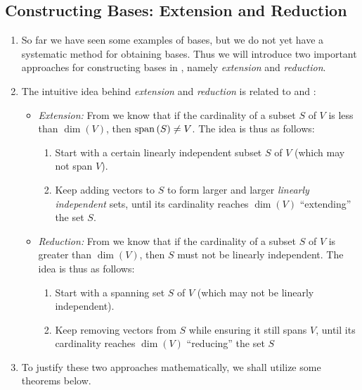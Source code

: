 \subsection{Constructing Bases: Extension and Reduction}
\label{subsect:construct-bases}
\begin{enumerate}
\item So far we have seen some examples of bases, but we do not yet have a
systematic method for obtaining bases. Thus we will introduce two important
approaches for constructing bases in , namely
\emph{extension} and \emph{reduction}.

\item The intuitive idea behind \emph{extension} and \emph{reduction} is
related to  and
:
\begin{itemize}
\item \emph{Extension:} From  we
know that if the cardinality of a subset \(S\) of \(V\) is less than
\(\dim(V)\), then \(\operatorname{span}\qty(S)\ne V\). The idea is thus as follows:
\begin{enumerate}
\item Start with a certain linearly independent subset \(S\) of \(V\) (which
may not span \(V\)).
\item  Keep adding vectors to \(S\) to form larger and larger \emph{linearly
independent} sets, until its cardinality reaches \(\dim(V)\)
 ``extending'' the set \(S\).
\end{enumerate}
\item \emph{Reduction:} From  we
know that if the cardinality of a subset \(S\) of \(V\) is greater than
\(\dim(V)\), then \(S\) must not be linearly independent. The idea is thus as follows:
\begin{enumerate}
\item Start with a spanning set \(S\) of \(V\) (which may not be linearly
independent).
\item Keep removing vectors from \(S\) while ensuring it still spans \(V\),
until its cardinality reaches \(\dim(V)\)  ``reducing'' the
set \(S\)
\end{enumerate}
\end{itemize}

\item To justify these two approaches mathematically, we shall utilize some
theorems below.


\end{enumerate}
